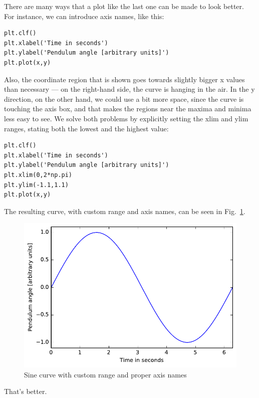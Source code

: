 \documentclass[twocolumn,apj]{openjournal}
\begin{document}
There are many ways that a plot like the last one can be made to look better. For instance, we can introduce axis names, like this:
\begin{lstlisting}
plt.clf()
plt.xlabel('Time in seconds')
plt.ylabel('Pendulum angle [arbitrary units]')
plt.plot(x,y)
\end{lstlisting}
Also, the coordinate region that is shown goes towards slightly bigger x values than necessary --- on the right-hand side, the curve is hanging in the air. In the y direction, on the other hand, we could use a bit more space, since the curve is touching the axis box, and that makes the regions near the maxima and minima less easy to see. We solve both problems by explicitly setting the xlim and ylim ranges, stating both the lowest and the highest value:
\begin{lstlisting}
plt.clf()
plt.xlabel('Time in seconds')
plt.ylabel('Pendulum angle [arbitrary units]')
plt.xlim(0,2*np.pi)
plt.ylim(-1.1,1.1)
plt.plot(x,y)
\end{lstlisting}
The resulting curve, with custom range and axis names, can be seen in Fig.~\ref{SinPlotBetter}.
\begin{figure}[htbp]
\begin{center}
\includegraphics[width=\linewidth]{sinplot-ranges.pdf}
\caption{Sine curve with custom range and proper axis names}
\label{SinPlotBetter}
\end{center}
\end{figure}
That's better.
\end{document}
